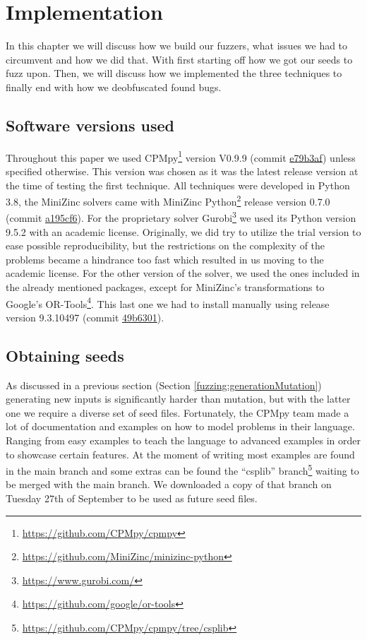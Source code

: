 \chapter{Implementation}
\label{cha:5:impl}
\label{impl:Intro}
In this chapter we will discuss how we build our fuzzers, what issues we had to circumvent and how we did that. With first starting off how we got our seeds to fuzz upon. Then, we will discuss how we implemented the three techniques to finally end with how we deobfuscated found bugs.

\section{Software versions used}
\label{impl:softwareVersion}
Throughout this paper we used CPMpy\footnote{\url{https://github.com/CPMpy/cpmpy}} version V0.9.9 (commit \href{https://github.com/CPMpy/cpmpy/commit/e79b3afedc934a9437c2ddb3a9f54d7e2d7bd3ee}{e79b3af}) unless specified otherwise. This version was chosen as it was the latest release version at the time of testing the first technique. All techniques were developed in Python 3.8, the MiniZinc solvers came with MiniZinc Python\footnote{\url{https://github.com/MiniZinc/minizinc-python}} release version 0.7.0 (commit \href{https://github.com/MiniZinc/minizinc-python/commit/a195cf63fcfbc98665d70ab64efb5424db25bd7e}{a195cf6}). For the proprietary solver Gurobi\footnote{\url{https://www.gurobi.com/}} we used its Python version 9.5.2 with an academic license. 
Originally, we did try to utilize the trial version to ease possible reproducibility, but the restrictions on the complexity of the problems became a hindrance too fast which resulted in us moving to the academic license. For the other version of the solver, we used the ones included in the already mentioned packages, except for MiniZinc’s transformations to Google’s OR-Tools\footnote{\url{https://github.com/google/or-tools}}. This last one we had to install manually using release version 9.3.10497 (commit \href{https://github.com/google/or-tools/commit/49b6301e1e1e231d654d79b6032e79809868a70e}{49b6301}).


\section{Obtaining seeds}
\label{impl:obtainingSeeds}
As discussed in a previous section (Section \ref{fuzzing:generationMutation}) generating new inputs is significantly harder than mutation, but with the latter one we require a diverse set of seed files. Fortunately, the CPMpy team made a lot of documentation and examples on how to model problems in their language. Ranging from easy examples to teach the language to advanced examples in order to showcase certain features. 
At the moment of writing most examples are found in the main branch and some extras can be found the “csplib” branch\footnote{\url{https://github.com/CPMpy/cpmpy/tree/csplib}} waiting to be merged with the main branch. We downloaded a copy of that branch on Tuesday 27th of September to be used as future seed files. 

